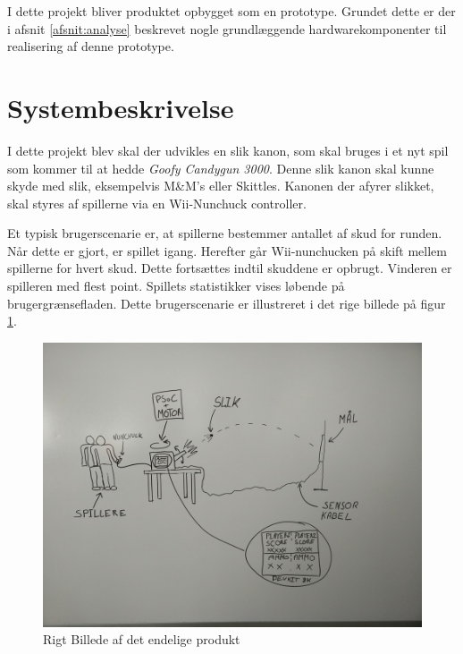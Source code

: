 \noindent I dette projekt bliver produktet opbygget som en prototype. Grundet dette er der i afsnit \ref{afsnit:analyse} beskrevet nogle grundlæggende hardwarekomponenter til realisering af denne prototype.


\section{Systembeskrivelse}
\label{afsnit:systembeskrivelse}
I dette projekt blev skal der udvikles en slik kanon, som skal bruges i et nyt spil som kommer til at hedde \textit{Goofy Candygun 3000}. Denne slik kanon skal kunne skyde med slik, eksempelvis M\&M’s eller Skittles. Kanonen der afyrer slikket, skal styres af spillerne via en Wii-Nunchuck controller.  \newline

\noindent Et typisk brugerscenarie er, at spillerne bestemmer antallet af skud for runden. Når dette er gjort, er spillet igang. Herefter går Wii-nunchucken på skift mellem spillerne for hvert skud. Dette fortsættes indtil skuddene er opbrugt. Vinderen er spilleren med flest point. Spillets statistikker vises løbende på brugergrænsefladen. Dette brugerscenarie er illustreret i det rige billede på figur \ref{fig:RigtBillede}.

\begin{figure}[H]
	\centering
	\includegraphics[width=\textwidth]{Projektformulering/images/rigtBillede}
	\caption{Rigt Billede af det endelige produkt}
	\label{fig:RigtBillede}
\end{figure}


